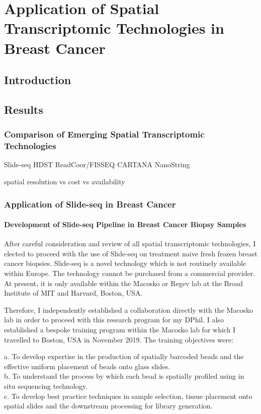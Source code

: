 \chapter{\label{ch:3}Application of Spatial Transcriptomic Technologies in Breast Cancer}

\minitoc

\section{Introduction}


\section{Results}


\subsection{Comparison of Emerging Spatial Transcriptomic Technologies}
Slide-seq
HDST
ReadCoor/FISSEQ
CARTANA
NanoString

spatial resolution vs cost vs availability



\subsection{Application of Slide-seq in Breast Cancer}
\subsubsection{Development of Slide-seq Pipeline in Breast Cancer Biopsy Samples}

After careful consideration and review of all spatial transcriptomic technologies, I elected to proceed with the use of Slide-seq on treatment naive fresh frozen breast cancer biopsies. Slide-seq is a novel technology which is not routinely available within Europe. The technology cannot be purchased from a commercial provider. At present, it is only available within the Macosko or Regev lab at the Broad Institute of MIT and Harvard, Boston, USA.


Therefore, I independently established a collaboration directly with the Macosko lab in order to proceed with this research program for my DPhil. I also established a bespoke training program within the Macosko lab for which I travelled to Boston, USA in November 2019. The training objectives were:

a. To develop expertise in the production of spatially barcoded beads and the effective uniform placement of beads onto glass slides. \\
b. To understand the process by which each bead is spatially profiled using in situ sequencing technology. \\
c. To develop best practice techniques in sample selection, tissue placement onto spatial slides and the downstream processing for library generation.

